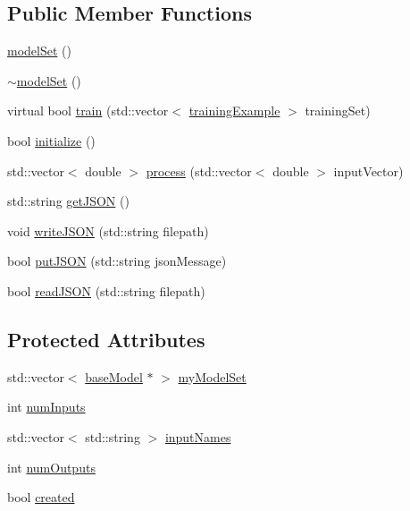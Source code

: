 \subsection*{Public Member Functions}
\begin{DoxyCompactItemize}
\item 
\hyperlink{classmodel_set_ae44cba85f4c52e7d05e0f622b3ea9030}{model\+Set} ()
\item 
\hyperlink{classmodel_set_a21eadb6e6cdd54dda57a4a94582bfe7b}{$\sim$model\+Set} ()
\item 
virtual bool \hyperlink{classmodel_set_ab0b16ec988c8077158de1c3d8986df03}{train} (std\+::vector$<$ \hyperlink{structtraining_example}{training\+Example} $>$ training\+Set)
\item 
bool \hyperlink{classmodel_set_afefb50a0fe8f45821c6a7599784d7eb4}{initialize} ()
\item 
std\+::vector$<$ double $>$ \hyperlink{classmodel_set_a232b11aa2987dd7db56c0f55edf868ea}{process} (std\+::vector$<$ double $>$ input\+Vector)
\item 
std\+::string \hyperlink{classmodel_set_a031987885b1462ec7d7dbeef0c803d97}{get\+J\+S\+ON} ()
\item 
void \hyperlink{classmodel_set_a805879b6c8ec54d16c2ac511c72442b9}{write\+J\+S\+ON} (std\+::string filepath)
\item 
bool \hyperlink{classmodel_set_a09b07168fbe9d9377eb26f30bf16884c}{put\+J\+S\+ON} (std\+::string json\+Message)
\item 
bool \hyperlink{classmodel_set_a8f7a837515889c6bddb3184a022b1727}{read\+J\+S\+ON} (std\+::string filepath)
\end{DoxyCompactItemize}
\subsection*{Protected Attributes}
\begin{DoxyCompactItemize}
\item 
std\+::vector$<$ \hyperlink{classbase_model}{base\+Model} $\ast$ $>$ \hyperlink{classmodel_set_a390b0b864a8e727f481537b3c37aa721}{my\+Model\+Set}
\item 
int \hyperlink{classmodel_set_ad10fbc1228a85f1200cb89589ad92755}{num\+Inputs}
\item 
std\+::vector$<$ std\+::string $>$ \hyperlink{classmodel_set_ab4b67d7dbdf0659ba6bd18af7247e2ad}{input\+Names}
\item 
int \hyperlink{classmodel_set_addc0df56b9f1970c9816050634933716}{num\+Outputs}
\item 
bool \hyperlink{classmodel_set_a0029dc6f8ccfd77353ad38b48198ad7d}{created}
\end{DoxyCompactItemize}


